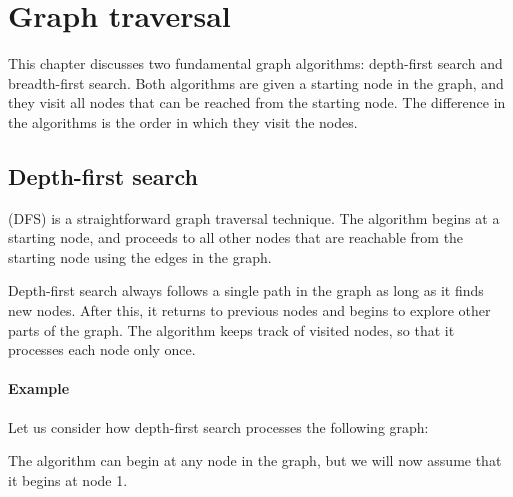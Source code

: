 \chapter{Graph traversal}

This chapter discusses two fundamental
graph algorithms:
depth-first search and breadth-first search.
Both algorithms are given a starting
node in the graph,
and they visit all nodes that can be reached
from the starting node.
The difference in the algorithms is the order
in which they visit the nodes.

\section{Depth-first search}


 (DFS)
is a straightforward graph traversal technique.
The algorithm begins at a starting node,
and proceeds to all other nodes that are
reachable from the starting node using
the edges in the graph.

Depth-first search always follows a single
path in the graph as long as it finds
new nodes.
After this, it returns to previous
nodes and begins to explore other parts of the graph.
The algorithm keeps track of visited nodes,
so that it processes each node only once.

\subsubsection*{Example}

Let us consider how depth-first search processes
the following graph:
\begin{center}
\end{center}
The algorithm can begin at any node in the graph,
but we will now assume that it begins
at node 1.

